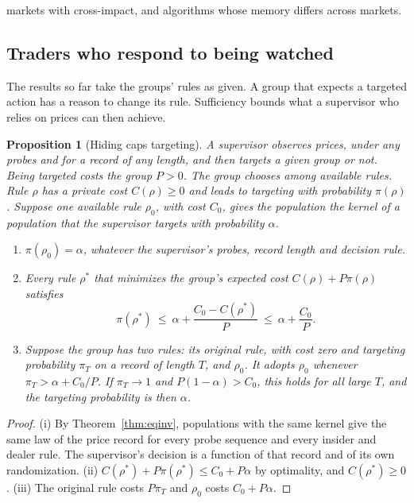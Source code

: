 \documentclass[12pt]{article}
\newtheorem{proposition}[theorem]{Proposition}
\theoremstyle{definition}
\theoremstyle{remark}
\begin{document}
markets with cross-impact, and algorithms whose memory differs across markets.

\subsection{Traders who respond to being watched}\label{sec:hiding}

The results so far take the groups' rules as given. A group that expects a targeted action has a reason to change its rule. Sufficiency bounds what a supervisor who relies on prices can then achieve.

\begin{proposition}[Hiding caps targeting]\label{prop:hiding}
A supervisor observes prices, under any probes and for a record of any length, and then targets a given group or not. Being targeted costs the group $P>0$. The group chooses among available rules. Rule $\rho$ has a private cost $C(\rho)\ge0$ and leads to targeting with probability $\pi(\rho)$. Suppose one available rule $\rho_0$, with cost $C_0$, gives the population the kernel of a population that the supervisor targets with probability $\alpha$.
\begin{enumerate}[label=(\roman*),itemsep=1pt]
\item $\pi(\rho_0)=\alpha$, whatever the supervisor's probes, record length and decision rule.
\item Every rule $\rho^*$ that minimizes the group's expected cost $C(\rho)+P\pi(\rho)$ satisfies
\[
\pi(\rho^*)\ \le\ \alpha+\frac{C_0-C(\rho^*)}{P}\ \le\ \alpha+\frac{C_0}{P}.
\]
\item Suppose the group has two rules: its original rule, with cost zero and targeting probability $\pi_T$ on a record of length $T$, and $\rho_0$. It adopts $\rho_0$ whenever $\pi_T>\alpha+C_0/P$. If $\pi_T\to1$ and $P(1-\alpha)>C_0$, this holds for all large $T$, and the targeting probability is then $\alpha$.
\end{enumerate}
\end{proposition}

\begin{proof}
(i) By Theorem~\ref{thm:eqinv}, populations with the same kernel give the same law of the price record for every probe sequence and every insider and dealer rule. The supervisor's decision is a function of that record and of its own randomization. (ii) $C(\rho^*)+P\pi(\rho^*)\le C_0+P\alpha$ by optimality, and $C(\rho^*)\ge0$. (iii) The original rule costs $P\pi_T$ and $\rho_0$ costs $C_0+P\alpha$.
\end{proof}
\end{document}
